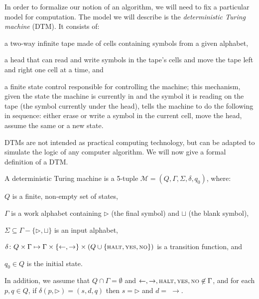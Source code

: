 In order to formalize our notion of an algorithm, we will need to fix a particular model for computation.
The model we will describe is the \emph{deterministic Turing machine} (DTM).
It consists of:
\begin{Enumerate}
    \item a two-way infinite tape made of cells containing symbols from a given alphabet,
	\item a head that can read and write symbols in the tape's cells and move the tape left and right one cell at a time, and
	\item a finite state control responsible for controlling the machine; this mechanism, given the state the machine is currently in and the symbol it is reading on the tape (the symbol currently under the head), tells the machine to do the following in sequence: either erase or write a symbol in the current cell, move the head, assume the same or a new state.
\end{Enumerate}
DTMs are not intended as practical computing technology, but can be adapted to si\-mu\-late the logic of any computer algorithm.
We will now give a formal definition of a DTM.

\begin{definition}
    A deterministic Turing machine is a 5-tuple $\mathcal{M}=(Q,\Gamma,\Sigma,\delta,q_0)$, where:
	\begin{Enumerate}
		\item $Q$ is a finite, non-empty set of states,
		\item $\Gamma$ is a work alphabet containing $\rhd$ (the final symbol) and $\sqcup$ (the blank symbol),
		\item $\Sigma\subseteq\Gamma-\{\rhd,\sqcup\}$ is an input alphabet,
		\item $\delta\colon Q\times\Gamma\mapsto\Gamma\times\{\leftarrow,\rightarrow\}\times(Q\cup\{{\scriptstyle\rm HALT},{\scriptstyle\rm YES},{\scriptstyle\rm NO}\})$ is a transition function, and
		\item $q_0\in Q$ is the initial state.
	\end{Enumerate}
	In addition, we assume that $Q\cap\Gamma=\emptyset$ and $\leftarrow,\rightarrow,{\scriptstyle\rm HALT},{\scriptstyle\rm YES},{\scriptstyle\rm NO}\not\in\Gamma$, and for each $p,q\in Q$, if $\delta(p,\rhd)=(s,d,q)$ then $s=\rhd$ and $d=\;\rightarrow$.
\end{definition}


